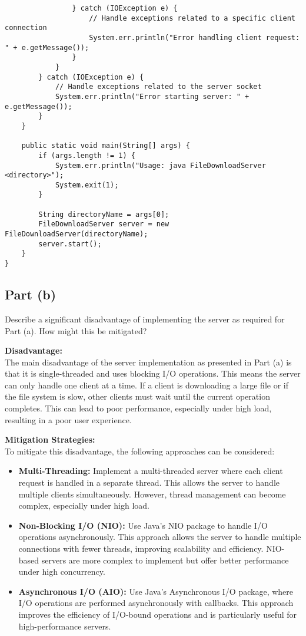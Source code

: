 \documentclass[12pt]{article}
\begin{document}
\begin{lstlisting}
                } catch (IOException e) {
                    // Handle exceptions related to a specific client connection
                    System.err.println("Error handling client request: " + e.getMessage());
                }
            }
        } catch (IOException e) {
            // Handle exceptions related to the server socket
            System.err.println("Error starting server: " + e.getMessage());
        }
    }

    public static void main(String[] args) {
        if (args.length != 1) {
            System.err.println("Usage: java FileDownloadServer <directory>");
            System.exit(1);
        }

        String directoryName = args[0];
        FileDownloadServer server = new FileDownloadServer(directoryName);
        server.start();
    }
}
\end{lstlisting}

\subsection*{Part (b)} Describe a significant disadvantage of implementing the server as required for
Part (a). How might this be mitigated? 

\vspace{0.1in} %

\textbf{Disadvantage:} \\
The main disadvantage of the server implementation as presented in Part (a) is that it is single-threaded and uses blocking I/O operations. This means the server can only handle one client at a time. If a client is downloading a large file or if the file system is slow, other clients must wait until the current operation completes. This can lead to poor performance, especially under high load, resulting in a poor user experience.

\textbf{Mitigation Strategies:} \\
To mitigate this disadvantage, the following approaches can be considered:

\begin{itemize}
    \item \textbf{Multi-Threading:} Implement a multi-threaded server where each client request is handled in a separate thread. This allows the server to handle multiple clients simultaneously. However, thread management can become complex, especially under high load.
    
    \item \textbf{Non-Blocking I/O (NIO):} Use Java’s NIO package to handle I/O operations asynchronously. This approach allows the server to handle multiple connections with fewer threads, improving scalability and efficiency. NIO-based servers are more complex to implement but offer better performance under high concurrency.

    \item \textbf{Asynchronous I/O (AIO):} Use Java's Asynchronous I/O package, where I/O operations are performed asynchronously with callbacks. This approach improves the efficiency of I/O-bound operations and is particularly useful for high-performance servers.
\end{itemize}
\end{document}
